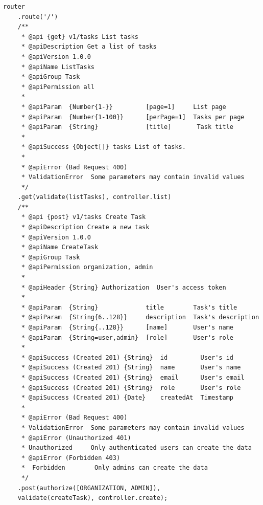 \documentclass[12pt]{article}
\begin{document}
\begin{verbatim}
router
    .route('/')
    /**
     * @api {get} v1/tasks List tasks
     * @apiDescription Get a list of tasks
     * @apiVersion 1.0.0
     * @apiName ListTasks
     * @apiGroup Task
     * @apiPermission all
     *
     * @apiParam  {Number{1-}}         [page=1]     List page
     * @apiParam  {Number{1-100}}      [perPage=1]  Tasks per page
     * @apiParam  {String}             [title]       Task title
     *
     * @apiSuccess {Object[]} tasks List of tasks.
     *
     * @apiError (Bad Request 400)   
     * ValidationError  Some parameters may contain invalid values
     */
    .get(validate(listTasks), controller.list)
    /**
     * @api {post} v1/tasks Create Task
     * @apiDescription Create a new task
     * @apiVersion 1.0.0
     * @apiName CreateTask
     * @apiGroup Task
     * @apiPermission organization, admin
     *
     * @apiHeader {String} Authorization  User's access token
     *
     * @apiParam  {String}             title        Task's title
     * @apiParam  {String{6..128}}     description  Task's description
     * @apiParam  {String{..128}}      [name]       User's name
     * @apiParam  {String=user,admin}  [role]       User's role
     *
     * @apiSuccess (Created 201) {String}  id         User's id
     * @apiSuccess (Created 201) {String}  name       User's name
     * @apiSuccess (Created 201) {String}  email      User's email
     * @apiSuccess (Created 201) {String}  role       User's role
     * @apiSuccess (Created 201) {Date}    createdAt  Timestamp
     *
     * @apiError (Bad Request 400)   
     * ValidationError  Some parameters may contain invalid values
     * @apiError (Unauthorized 401)  
     * Unauthorized     Only authenticated users can create the data
     * @apiError (Forbidden 403)    
     *  Forbidden        Only admins can create the data
     */
    .post(authorize([ORGANIZATION, ADMIN]), 
    validate(createTask), controller.create);



\end{verbatim}
\end{document}
